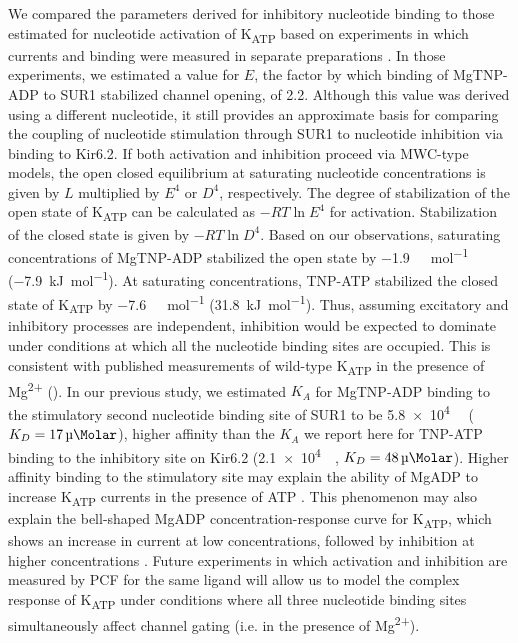 \documentclass[10pt,lineno, doublespacing]{elife}
\begin{document}
We compared the parameters derived for inhibitory nucleotide binding to those estimated for nucleotide activation of K\textsubscript{ATP} based on experiments in which currents and binding were measured in separate preparations \citep{RN80}.
In those experiments, we estimated a value for $E$, the factor by which binding of MgTNP-ADP to SUR1 stabilized channel opening, of 2.2.
Although this value was derived using a different nucleotide, it still provides an approximate basis for comparing the coupling of nucleotide stimulation through SUR1 to nucleotide inhibition via binding to Kir6.2.
If both activation and inhibition proceed via MWC-type models, the open closed equilibrium at saturating nucleotide concentrations is given by $L$ multiplied by $E^4$ or $D^4$, respectively.
The degree of stabilization of the open state of K\textsubscript{ATP} can be calculated as $-RT\ln{E^4}$ for activation.
Stabilization of the closed state is given by $-RT\ln{D^4}$.
Based on our observations, saturating concentrations of MgTNP-ADP stabilized the open state by \SI{-1.9}{\kilo\Calorie\per\mole} (\SI{-7.9}{\kilo\joule\per\mole}).
At saturating concentrations, TNP-ATP stabilized the closed state of K\textsubscript{ATP} by \SI{-7.6}{\kilo\Calorie\per\mole} (\SI{31.8}{\kilo\joule\per\mole}).
Thus, assuming excitatory and inhibitory processes are independent, inhibition would be expected to dominate under conditions at which all the nucleotide binding sites are occupied.
This is consistent with published measurements of wild-type K\textsubscript{ATP} in the presence of Mg\textsuperscript{2+} (\cite{RN28}).
In our previous study, we estimated $K_A$ for MgTNP-ADP binding to the stimulatory second nucleotide binding site of SUR1 to be \SI{5.8e4}{\per\Molar} ($K_D = \SI{17}{\micro\Molar}$), higher affinity than the $K_A$ we report here for TNP-ATP binding to the inhibitory site on Kir6.2 (\SI{2.1e4}{\per\Molar}, $K_D = \SI{48}{\micro\Molar}$).
Higher affinity binding to the stimulatory site may explain the ability of MgADP to increase K\textsubscript{ATP} currents in the presence of ATP \citep{RN82}.
This phenomenon may also explain the bell-shaped MgADP concentration-response curve for K\textsubscript{ATP}, which shows an increase in current at low concentrations, followed by inhibition at higher concentrations \citep{RN28, RN3}.
Future experiments in which activation and inhibition are measured by PCF for the same ligand will allow us to model the complex response of K\textsubscript{ATP} under conditions where all three nucleotide binding sites simultaneously affect channel gating (i.e. in the presence of Mg\textsuperscript{2+}).
\end{document}
